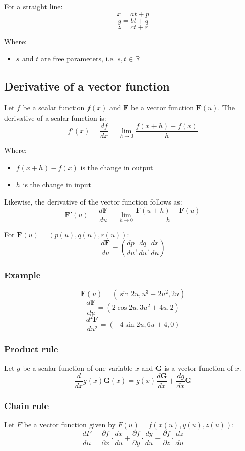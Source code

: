 \documentclass[11pt]{article}
\begin{document}
For a straight line:
\[x = at + p\]
\[y = bt + q\]
\[z = ct + r\]

Where:
\begin{itemize}
\item \(s\) and \(t\) are free parameters, i.e. \(s, t \in \mathbb{R}\)
\end{itemize}

\subsection{Derivative of a vector function}
\label{sec:orgc90ba8c}
Let \(f\) be a scalar function \(f(x)\) and \(\boldsymbol{F}\) be a vector function \(\boldsymbol{F}(u)\). The derivative of a scalar function is:
\[f'(x) = \frac{df}{dx} = \lim_{h \rightarrow 0} \frac{f(x + h) - f(x)}{h}\]

Where:
\begin{itemize}
\item \(f(x + h) - f(x)\) is the change in output
\item \(h\) is the change in input
\end{itemize}

Likewise, the derivative of the vector function follows as:
\[\boldsymbol{F}'(u) = \frac{d \boldsymbol{F}}{du} = \lim_{h \rightarrow 0} \frac{\boldsymbol{F}(u + h) - \boldsymbol{F}(u)}{h}\]

For \(\boldsymbol{F}(u) = (p(u), q(u), r(u))\):
\[\frac{d \boldsymbol{F}}{du} = \left(\frac{dp}{du}, \frac{dq}{du}, \frac{dr}{du} \right)\]

\subsubsection{Example}
\label{sec:org3958f92}
\[\boldsymbol{F}(u) = (\sin 2u, u^3 + 2u^2, 2u)\]
\[\frac{d \boldsymbol{F}}{du} = (2 \cos 2u, 3u^2 + 4u, 2)\]
\[\frac{d^2 \boldsymbol{F}}{du^2} = (-4 \sin 2u, 6u + 4, 0)\]

\subsubsection{Product rule}
\label{sec:org9c67a8a}
Let \(g\) be a scalar function of one variable \(x\) and \(\boldsymbol{G}\) is a vector function of \(x\).
\[\frac{d}{dx} g(x) \boldsymbol{G}(x) = g(x) \frac{d \boldsymbol{G}}{dx} + \frac{dg}{dx} \boldsymbol{G}\]

\subsubsection{Chain rule}
\label{sec:org191578a}
Let \(F\) be a vector function given by \(F(u) = f(x(u), y(u), z(u))\):
\[\frac{dF}{du} = \frac{\partial f}{\partial x} \cdot \frac{dx}{du} + \frac{\partial f}{\partial y} \cdot \frac{dy}{du} + \frac{\partial f}{\partial z} \cdot \frac{dz}{du}\]
\end{document}
